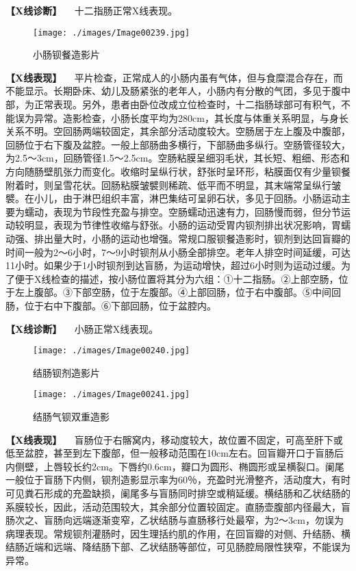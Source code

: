 \textbf{【X线诊断】} 　十二指肠正常X线表现。

\begin{figure}[!htbp]
 \centering
 \texttt{[image: ./images/Image00239.jpg]}
 \captionsetup{justification=centering}
 \caption{小肠钡餐造影片}
 \label{fig5-1-7}
  \end{figure} 

\textbf{【X线表现】}
　平片检查，正常成人的小肠内虽有气体，但与食糜混合存在，而不能显示。长期卧床、幼儿及肠紧张的老年人，小肠内有分散的气团，多见于腹中部，为正常表现。另外，患者由卧位改成立位检查时，十二指肠球部可有积气，不能误为异常。造影检查，小肠长度平均为280cm，其长度与体重关系明显，与身长关系不明。空回肠两端较固定，其余部分活动度较大。空肠居于左上腹及中腹部，回肠位于右下腹及盆腔。一般上部肠曲多横行，下部肠曲多纵行。空肠管径较大，为2.5～3cm，回肠管径1.5～2.5cm。空肠粘膜呈细羽毛状，其长短、粗细、形态和方向随肠壁肌张力而变化。收缩时呈纵行状，舒张时呈环形，粘膜面仅有少量钡餐附着时，则呈雪花状。回肠粘膜皱襞则稀疏、低平而不明显，其末端常呈纵行皱襞。在小儿，由于淋巴组织丰富，淋巴集结可呈卵石状，多见于回肠。小肠运动主要为蠕动，表现为节段性充盈与排空。空肠蠕动迅速有力，回肠慢而弱，但分节运动较明显，表现为节律性收缩与舒张。小肠的运动受胃内钡剂排出状况影响，胃蠕动强、排出量大时，小肠的运动也增强。常规口服钡餐造影时，钡剂到达回盲瓣的时间一般为2～6小时，7～9小时钡剂从小肠全部排空。老年人排空时间延缓，可达11小时。如果少于1小时钡剂到达盲肠，为运动增快，超过6小时则为运动过缓。为了便于X线检查的描述，按小肠位置将其分为六组：①十二指肠。②上部空肠，位于左上腹部。③下部空肠，位于左腹部。④上部回肠，位于右中腹部。⑤中间回肠，位于右中下腹部。⑥下部回肠，位于盆腔内。

\textbf{【X线诊断】} 　小肠正常X线表现。

\begin{figure}[!htbp]
 \centering
 \texttt{[image: ./images/Image00240.jpg]}
 \captionsetup{justification=centering}
 \caption{结肠钡剂造影片}
 \label{fig5-1-8}
  \end{figure} 

\begin{figure}[!htbp]
 \centering
 \texttt{[image: ./images/Image00241.jpg]}
 \captionsetup{justification=centering}
 \caption{结肠气钡双重造影}
 \label{fig5-1-9}
  \end{figure} 

\textbf{【X线表现】}
　盲肠位于右髂窝内，移动度较大，故位置不固定，可高至肝下或低至盆腔，甚至到左下腹部，但一般移动范围在10cm左右。回盲瓣开口于盲肠后内侧壁，上唇较长约2cm。下唇约0.6cm，瓣口为圆形、椭圆形或呈横裂口。阑尾一般位于盲肠下内侧，钡剂造影显示率为60％，充盈时光滑整齐，活动度大，有时可见粪石形成的充盈缺损，阑尾多与盲肠同时排空或稍延缓。横结肠和乙状结肠的系膜较长，因此，活动范围较大，其余部分位置较固定。直肠壶腹部内径最大，盲肠次之、盲肠向远端逐渐变窄，乙状结肠与直肠移行处最窄，为2～3cm，勿误为病理表现。常规钡剂灌肠时，因生理括约肌的作用，在回盲瓣的对侧、升结肠、横结肠近端和远端、降结肠下部、乙状结肠等部位，可见肠腔局限性狭窄，不能误为异常。

